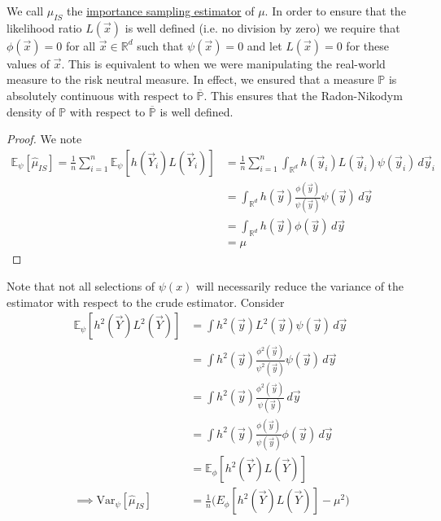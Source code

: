 \documentclass[12pt]{article}
\newenvironment{theorem}[2][Theorem:]{\begin{trivlist} %
\item[\hskip \labelsep {\bfseries #1}\hskip \labelsep {\bfseries #2.}]}{\end{trivlist}}
\newlength\tindent
\renewcommand{\indent}{\hspace*{\tindent}}
\begin{document}
\indent We call $\hat{\mu}_{IS}$ the \underline{importance sampling estimator} of $\mu$. In order to ensure that the likelihood ratio $L(\vec{x})$ is well defined (i.e. no division by zero) we require that $\phi(\vec{x}) = 0$ for all $\vec{x} \in \mathbb R^d$ such that $\psi(\vec{x}) = 0$ and let $L(\vec{x}) = 0$ for these values of $\vec{x}$. This is equivalent to when we were manipulating the real-world measure to the risk neutral measure. In effect, we ensured that a measure $\mathbb P$ is absolutely continuous with respect to $\mathbb {\overline{P}}$. This ensures that the Radon-Nikodym density of $\mathbb P$ with respect to $\mathbb {\overline{P}}$ is well defined.

\begin{theorem}{The importance sampling estimator is unbiased} \hfill
\begin{proof} We note
\begin{align*}
	\mathbb E_{\psi}[\hat{\mu}_{IS}] = \frac{1}{n} \sum^n_{i=1} \mathbb E_{\psi}[h(\vec{Y}_i)L(\vec{Y}_i)] &= \frac{1}{n} \sum^n_{i=1} \int_{\mathbb R^d} h(\vec{y}_i)L(\vec{y}_i) \psi(\vec{y}_i)\,d\vec{y}_i \\
	&= \int_{\mathbb R^d} h(\vec{y}) \frac{\phi(\vec{y})}{\psi(\vec{y})}  \psi(\vec{y})\,d\vec{y} \\
	&= \int_{\mathbb R^d} h(\vec{y}) \phi(\vec{y}) \,d\vec{y} \\
	&= \mu
\end{align*}
\end{proof}
\end{theorem}

\indent Note that not all selections of $\psi(x)$ will necessarily reduce the variance of the estimator with respect to the crude estimator. Consider
\begin{align*}
	\mathbb E_{\psi}[h^2(\vec{Y})L^2(\vec{Y})] &= \int h^2(\vec{y})L^2(\vec{y}) \psi(\vec{y}) \,d\vec{y} \\
	&= \int h^2(\vec{y}) \frac{\phi^2(\vec{y})}{\psi^2(\vec{y})} \psi(\vec{y}) \,d\vec{y} \\
	&= \int h^2(\vec{y}) \frac{\phi^2(\vec{y})}{\psi(\vec{y})} \,d\vec{y} \\
	&= \int h^2(\vec{y}) \frac{\phi(\vec{y})}{\psi(\vec{y})} \phi(\vec{y}) \,d\vec{y} \\
	&= \mathbb E_{\phi}[h^2(\vec{Y})L(\vec{Y})] \\
	\implies \mathrm{Var}_{\psi}[\hat{\mu}_{IS}] &= \frac{1}{n}\bigg( E_{\phi}[h^2(\vec{Y})L(\vec{Y})] - \mu^2 \bigg)
\end{align*} 
\end{document}
